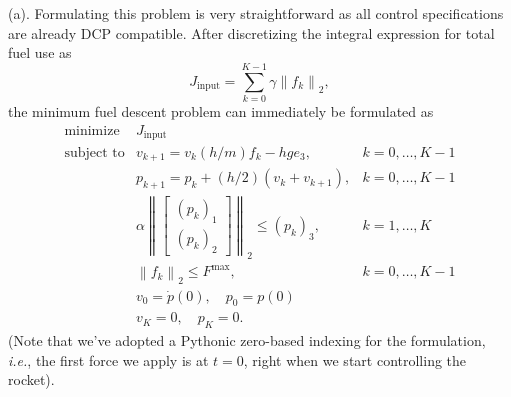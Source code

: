 \documentclass[12pt,reqno]{article}
\theoremstyle{definition}
\numberwithin{equation}{section}
\begin{document}
    \noindent (a). Formulating this problem is very straightforward as all
    control specifications are already DCP compatible. After discretizing the integral expression for total fuel use as
    \[J_{\mathrm{input}} = \sum_{k=0}^{K-1}\gamma \left\lVert f_k \right\rVert_{2},\]
    the minimum fuel descent problem can immediately be formulated as
    \[\begin{array}{lll}
    \text{minimize} \; & J_{\mathrm{input}} & \\
    \text{subject to} & v_{k+1} = v_k (h/m)f_k - hge_3, & k = 0, \ldots, K-1 \\
    & p_{k+1} = p_k + (h/2)(v_k + v_{k+1}), & k = 0, \ldots, K-1 \\
    & \alpha \left\lVert \begin{bmatrix} (p_k)_1 \\ (p_k)_2 \end{bmatrix} \right\rVert_{2} \le (p_k)_3, & k=1, \ldots, K \\
    & \left\lVert f_k \right\rVert_{2} \le F^{\mathrm{max}}, & k = 0, \ldots, K-1 \\
    & v_{0} = \dot{p}(0), \quad p_0 = p(0) & \\
    & v_{K} = 0, \quad p_{K} = 0.
    \end{array}\]
    (Note that we've adopted a Pythonic zero-based indexing for the formulation, \textit{i.e.},
    the first force we apply is at $t=0$, right when we start controlling the rocket).
\end{document}

